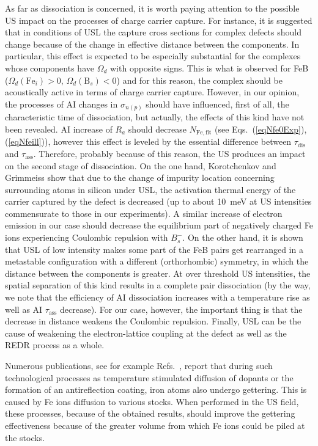 \documentclass[%
 aip,jap,
 amsmath,amssymb,
 reprint,%
]{revtex4-1}
\begin{document}
As far as dissociation is concerned, it is worth paying attention to the possible  US impact on the processes of charge carrier capture.
For instance,  it is suggested \cite{Olikh2018JAP} that in conditions of USL the capture cross sections for complex defects should change because of the change in effective distance between the components.
In particular, this effect is expected to be especially substantial for the complexes whose components have $\Omega_d$ with opposite signs.
This is what is observed for FeB ($\Omega_d(\mathrm{Fe}_i)>0$, $\Omega_d(\mathrm{B}_s)<0$)
and for this reason, the complex should be acoustically active in terms of charge carrier capture.
However, in our opinion, the processes of AI changes in $\sigma_{n(p)}$ should have influenced,
first of all, the characteristic time of dissociation,
but actually, the effects of this kind have not been revealed.
AI increase of $R_a$ should decrease $N_\mathrm{Fe,fit}$ (see Eqs.~(\ref{eqNfe0Exp}),(\ref{eqNfeill})),
however this effect is leveled by the essential difference between $\tau_\mathrm{dis}$
and $\tau_\mathrm{ass}$.
Therefore, probably because of this reason, the US produces an impact on the second stage of dissociation.
On the one hand, Korotchenkov and Grimmeiss show \cite{Korotchenkov1995} that due to the change of impurity location concerning surrounding atoms in silicon under USL,
the activation thermal energy of the carrier captured by the defect  is decreased
(up to about 10~meV at US intensities commensurate to those in our experiments).
A similar increase of electron emission in our case should decrease the equilibrium part of negatively charged Fe ions experiencing Coulombic repulsion with $B_s^-$.
On the other hand, it is shown \cite{OlikhPSS} that USL of low intensity makes some part of the FeB pairs get rearranged in a metastable configuration with a different (orthorhombic) symmetry,
in which the distance between the components is  greater.
At over threshold US intensities, the spatial separation of this kind results in a complete pair dissociation \cite{Ostapenko1995SST,Ostapenko1994APL} (by the way, we note that the efficiency of AI dissociation increases with a temperature rise as well as AI $\tau_\mathrm{ass}$ decrease).
For our case, however, the important thing is that the decrease in distance weakens the Coulombic repulsion.
Finally, USL can be the cause of weakening the electron-lattice coupling at the defect as well as the REDR process as a whole.

Numerous publications, see for example Refs.~, report that during such technological processes as temperature stimulated diffusion of dopants or the formation of an antireflection coating,
iron atoms also undergo gettering.
This is caused by Fe ions diffusion to various stocks.
When performed in the US field, these processes, because of the obtained results,
should  improve the gettering effectiveness because of the greater volume from which
Fe ions could be piled at the stocks.
\end{document}
